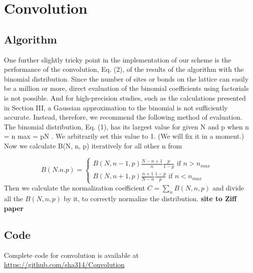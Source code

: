\chapter{Convolution}
\section{Algorithm}
One further slightly tricky point in the implementation of our scheme is the performance of the convolution, Eq. (2), of the results of the algorithm with the binomial distribution. Since the number of sites or bonds on the
lattice can easily be a million or more, direct evaluation of the binomial coefficients using factorials is not possible. And for high-precision studies, such as the calculations presented in Section III, a Gaussian approximation to the binomial is not sufficiently accurate. Instead, therefore, we recommend the following method of evaluation. The binomial distribution, Eq. (1), has its largest value for given N and p when n = n max = pN . We arbitrarily set this value to 1. (We will fix it in a moment.) Now we calculate B(N, n, p) iteratively for all other n from

\begin{equation*}
B(N.n.p) = 
\begin{cases}
	B(N, n-1, p) \frac{N-n+1}{n} \frac{p}{1-p}  \text{ if } n > n_{max}\\
	B(N, n+1, p) \frac{n+1}{N-n} \frac{1-p}{p}  \text{ if } n < n_{max}
\end{cases}   
\end{equation*}
Then we calculate the normalization coefficient $C = \sum_{n} B(N, n, p)$ and divide all the $B(N, n, p)$ by it, to correctly normalize the distribution. \textbf{site to Ziff paper}
\section{Code}
Complete code for convolution is available at 
\url{https://github.com/sha314/Convolution}\\
